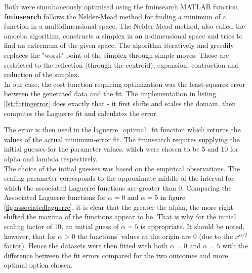 \documentclass[a4paper]{article}
\numberwithin{equation}{section}
\begin{document}
\noindent Both were simultaneously optimised using the fminsearch MATLAB function. \textbf{fminsearch} follows the Nelder-Mead method for finding a minimum of a function in a multidimensional space. The Nelder-Mead method, also called the amoeba algorithm, constructs a simplex in an n-dimensional space and tries to find an extremum of the given space. The algorithm iteratively and greedily replaces the "worst" point of the simplex through simple moves. Those are restricted to the reflection (through the centroid), expansion, contraction and reduction of the simplex. \\

\noindent In our case, the cost function requiring optimization was the least-squares error between the generated data and the fit. The implementation in listing \ref{lst:fittingerror} does exactly that - it first shifts and scales the domain, then computes the Laguerre fit and calculates the error.



\noindent The error is then used in the laguerre\_optimal\_fit function which returns the values of the actual minimum-error fit. The fminsearch requires supplying the initial guesses for the parameter values, which were chosen to be 5 and 10 for alpha and lambda respectively. \\

\noindent The choice of the initial guesses was based on the empirical observations. The scaling parameter corresponds to the approximate middle of the interval for which the associated Laguerre functions are greater than 0.
Comparing the Associated Laguerre functions for $\alpha = 0$ and $\alpha = 5$ in figure \ref{fig:associatedlaguerre}, it is clear that the greater the alpha, the more right-shifted the maxima of the functions appear to be. That is why for the initial scaling factor of 10, an initial guess of $\alpha = 5$ is appropriate. It should be noted, however, that for $\alpha > 0$ the functions' values at the origin are 0 (due to the $x^{\alpha/2}$ factor). Hence the datasets were then fitted with both $\alpha = 0$ and $\alpha = 5$ with the difference between the fit errors compared for the two outcomes and more optimal option chosen.


\end{document}
